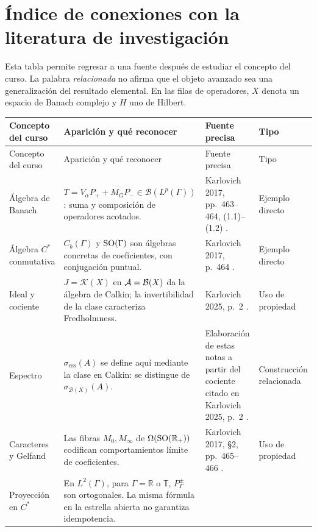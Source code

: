 \chapter*{Índice de conexiones con la literatura de investigación}

Esta tabla permite regresar a una fuente después de estudiar el concepto del curso.
La palabra \emph{relacionada} no afirma que el objeto avanzado sea una
generalización del resultado elemental. En las filas de operadores,
$X$ denota un espacio de Banach complejo y $H$ uno de Hilbert.

\footnotesize
\begin{longtable}{>{\raggedright\arraybackslash}p{2.5cm}>{\raggedright\arraybackslash}p{5.5cm}>{\raggedright\arraybackslash}p{3.6cm}>{\raggedright\arraybackslash}p{2.0cm}}
\toprule
Concepto del curso & Aparición y qué reconocer & Fuente precisa & Tipo\\
\midrule
\endfirsthead
\toprule
Concepto del curso & Aparición y qué reconocer & Fuente precisa & Tipo\\
\midrule
\endhead
Álgebra de Banach &
$T=V_\alpha P_++M_GP_-\in\mathcal B(L^p(\Gamma))$:
suma y composición de operadores acotados. &
Karlovich 2017, pp.~463--464, (1.1)--(1.2) \cite{Karlovich2017}. &
Ejemplo directo\\
Álgebra $C^*$ conmutativa &
$C_b(\Gamma)$ y $\operatorname{SO}(\Gamma)$ son álgebras concretas de coeficientes,
con conjugación puntual. &
Karlovich 2017, p.~464 \cite{Karlovich2017}. &
Ejemplo directo\\
Ideal y cociente &
$J=\mathcal K(X)$ en $\mathcal A=\mathcal B(X)$ da la álgebra de Calkin;
la invertibilidad de la clase caracteriza Fredholmness. &
Karlovich 2025, p.~2 \cite{Karlovich2025}. &
Uso de propiedad\\
Espectro &
$\sigma_{\mathrm{ess}}(A)$ se define aquí mediante la clase en Calkin:
se distingue de $\sigma_{\mathcal B(X)}(A)$. &
Elaboración de estas notas a partir del cociente citado en Karlovich 2025, p.~2 \cite{Karlovich2025}. &
Construcción relacionada\\
Caracteres y Gelfand &
Las fibras $M_0,M_\infty$ de $\Omega(\operatorname{SO}(\mathbb R_+))$ codifican
comportamientos límite de coeficientes. &
Karlovich 2017, §2, pp.~465--466 \cite{Karlovich2017}. &
Uso de propiedad\\
Proyección en $C^*$ &
En $L^2(\Gamma)$, para $\Gamma=\mathbb R$ o $\mathbb T$,
$P_\Gamma^\pm$ son ortogonales.
La misma fórmula en la estrella abierta no garantiza idempotencia. &

\end{longtable}
